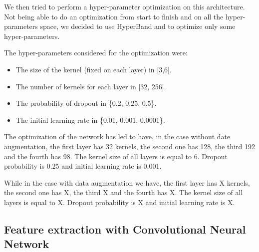 We then tried to perform a hyper-parameter optimization on this architecture.
Not being able to do an optimization from start to finish and on all the hyper-parameters space, we decided to use HyperBand and to optimize only some hyper-parameters.

The hyper-parameters considered for the optimization were: 
\begin{itemize}
    \item The size of the kernel (fixed on each layer) in [3,6].
    \item The number of kernels for each layer in [32, 256].
    \item The probability of dropout in \{0.2, 0.25, 0.5\}.
    \item The initial learning rate in \{0.01, 0.001, 0.0001\}.
\end{itemize}

The optimization of the network has led to have, in the case without date augmentation, the first layer has 32 kernels, the second one has 128, the third 192 and the fourth has 98. The kernel size of all layers is equal to 6. Dropout probability is 0.25 and initial learning rate is 0.001.

While in the case with data augmentation we have, the first layer has X kernels, the second one has X, the third X and the fourth has X. The kernel size of all layers is equal to X. Dropout probability is X and initial learning rate is X.

\subsection{Feature extraction with Convolutional Neural Network}

